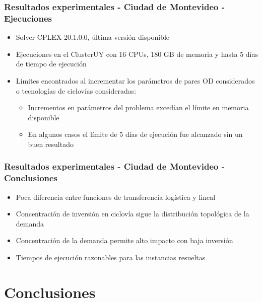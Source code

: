 \documentclass[aspectratio=43, 10pt]{beamer}
\begin{document}
\begin{frame}
    \frametitle{Resultados experimentales - Ciudad de Montevideo - Ejecuciones}

    \begin{itemize}
        \item{Solver CPLEX 20.1.0.0, última versión disponible}
        \item{Ejecuciones en el ClusterUY con 16 CPUs, 180 GB de memoria y hasta 5 días de tiempo de ejecución}
        \item{Límites encontrados al incrementar los parámetros de pares OD considerados o tecnologías de ciclovías consideradas:
            \begin{itemize}
                \item{Incrementos en parámetros del problema excedían el límite en memoria disponible}
                \item{En algunos casos el límite de 5 días de ejecución fue alcanzado sin un buen resultado}
            \end{itemize}
        }
    \end{itemize}
\end{frame}

\begin{frame}
    \frametitle{Resultados experimentales - Ciudad de Montevideo - Conclusiones}

    \begin{itemize}
        \item{Poca diferencia entre funciones de transferencia logística y lineal}
        \item{Concentración de inversión en ciclovía sigue la distribución topológica de la demanda}
        \item{Concentración de la demanda permite alto impacto con baja inversión}
        \item{Tiempos de ejecución razonables para las instancias resueltas}
    \end{itemize}
\end{frame}

\section{Conclusiones}
\end{document}
